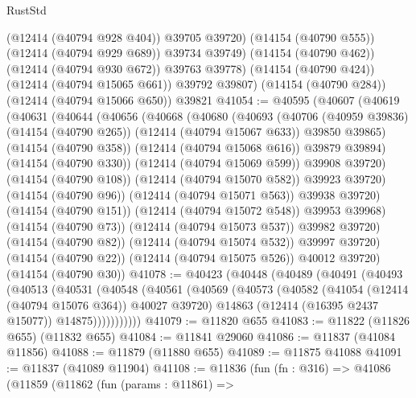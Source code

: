 \begin{lexlean}{RustStd}
\begin{coremodule}
            (@12414 (@40794 @928 @404))
            @39705
            @39720)
          (@14154 (@40790 @555))
          (@12414 (@40794 @929 @689))
          @39734
          @39749)
        (@14154 (@40790 @462))
        (@12414 (@40794 @930 @672))
        @39763
        @39778)
      (@14154 (@40790 @424))
      (@12414 (@40794 @15065 @661))
      @39792
      @39807)
    (@14154 (@40790 @284))
    (@12414 (@40794 @15066 @650))
    @39821
@41054 := @40595
    (@40607
      (@40619
        (@40631
          (@40644
            (@40656
              (@40668
                (@40680
                  (@40693
                    (@40706
                      (@40959 @39836)
                      (@14154 (@40790 @265))
                      (@12414 (@40794 @15067 @633))
                      @39850
                      @39865)
                    (@14154 (@40790 @358))
                    (@12414 (@40794 @15068 @616))
                    @39879
                    @39894)
                  (@14154 (@40790 @330))
                  (@12414 (@40794 @15069 @599))
                  @39908
                  @39720)
                (@14154 (@40790 @108))
                (@12414 (@40794 @15070 @582))
                @39923
                @39720)
              (@14154 (@40790 @96))
              (@12414 (@40794 @15071 @563))
              @39938
              @39720)
            (@14154 (@40790 @151))
            (@12414 (@40794 @15072 @548))
            @39953
            @39968)
          (@14154 (@40790 @73))
          (@12414 (@40794 @15073 @537))
          @39982
          @39720)
        (@14154 (@40790 @82))
        (@12414 (@40794 @15074 @532))
        @39997
        @39720)
      (@14154 (@40790 @22))
      (@12414 (@40794 @15075 @526))
      @40012
      @39720)
    (@14154 (@40790 @30))
@41078 := @40423
    (@40448
      (@40489
        (@40491
          (@40493
            (@40513
              (@40531
                (@40548
                  (@40561
                    (@40569
                      (@40573
                        (@40582
                          (@41054 (@12414 (@40794 @15076 @364)) @40027 @39720)
                          @14863
                          (@12414 (@16395 @2437 @15077))
                          @14875)))))))))))
@41079 := @11820 @655
@41083 := @11822 (@11826 @655) (@11832 @655)
@41084 := @11841 @29060
@41086 := @11837 (@41084 @11856)
@41088 := @11879 (@11880 @655)
@41089 := @11875 @41088
@41091 := @11837 (@41089 @11904)
@41108 := @11836
    (fun (fn : @316) =>
    @41086
      (@11859
        (@11862
          (fun (params : @11861) =>

\end{coremodule}
\end{lexlean}
